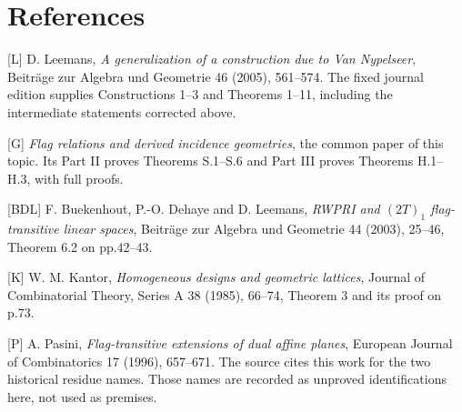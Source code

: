 \section{References}
[L] D. Leemans, \emph{A generalization of a construction due to Van
Nypelseer}, Beitr\"age zur Algebra und Geometrie 46 (2005), 561--574.
The fixed journal edition supplies Constructions 1--3 and Theorems
1--11, including the intermediate statements corrected above.

[G] \emph{Flag relations and derived incidence geometries}, the common
paper of this topic. Its Part II proves Theorems S.1--S.6 and Part III
proves Theorems H.1--H.3, with full proofs.

[BDL] F. Buekenhout, P.-O. Dehaye and D. Leemans, \emph{RWPRI and
$(2T)_1$ flag-transitive linear spaces}, Beitr\"age zur Algebra und
Geometrie 44 (2003), 25--46, Theorem 6.2 on pp.42--43.

[K] W. M. Kantor, \emph{Homogeneous designs and geometric lattices},
Journal of Combinatorial Theory, Series A 38 (1985), 66--74,
Theorem 3 and its proof on p.73.

[P] A. Pasini, \emph{Flag-transitive extensions of dual affine planes},
European Journal of Combinatorics 17 (1996), 657--671. The source cites
this work for the two historical residue names. Those names are recorded
as unproved identifications here, not used as premises.
